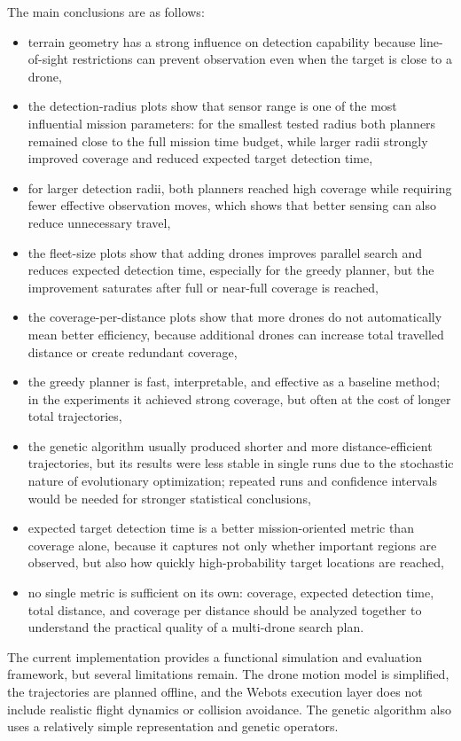 \documentclass[english]{projectreport}
\begin{document}
The main conclusions are as follows:
\begin{itemize}
    \item terrain geometry has a strong influence on detection capability because line-of-sight restrictions can prevent observation even when the target is close to a drone,
    \item the detection-radius plots show that sensor range is one of the most influential mission parameters: for the smallest tested radius both planners remained close to the full mission time budget, while larger radii strongly improved coverage and reduced expected target detection time,
    \item for larger detection radii, both planners reached high coverage while requiring fewer effective observation moves, which shows that better sensing can also reduce unnecessary travel,
    \item the fleet-size plots show that adding drones improves parallel search and reduces expected detection time, especially for the greedy planner, but the improvement saturates after full or near-full coverage is reached,
    \item the coverage-per-distance plots show that more drones do not automatically mean better efficiency, because additional drones can increase total travelled distance or create redundant coverage,
    \item the greedy planner is fast, interpretable, and effective as a baseline method; in the experiments it achieved strong coverage, but often at the cost of longer total trajectories,
    \item the genetic algorithm usually produced shorter and more distance-efficient trajectories, but its results were less stable in single runs due to the stochastic nature of evolutionary optimization; repeated runs and confidence intervals would be needed for stronger statistical conclusions,
    \item expected target detection time is a better mission-oriented metric than coverage alone, because it captures not only whether important regions are observed, but also how quickly high-probability target locations are reached,
    \item no single metric is sufficient on its own: coverage, expected detection time, total distance, and coverage per distance should be analyzed together to understand the practical quality of a multi-drone search plan.
\end{itemize}

The current implementation provides a functional simulation and evaluation
framework, but several limitations remain. The drone motion model is simplified,
the trajectories are planned offline, and the Webots execution layer does not
include realistic flight dynamics or collision avoidance. The genetic algorithm
also uses a relatively simple representation and genetic operators.
\end{document}
